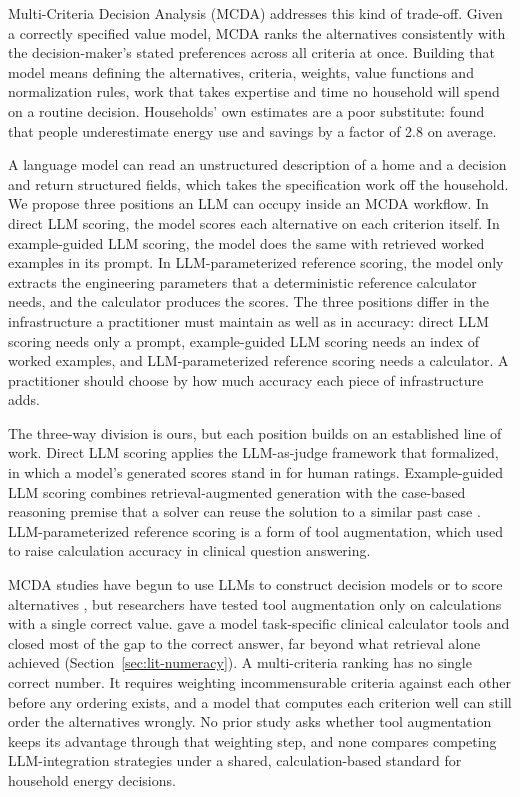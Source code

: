 \documentclass[final,3p,times]{elsarticle}
\begin{document}
Multi-Criteria Decision Analysis (MCDA) \cite{huang2011} addresses this kind of trade-off. Given a correctly specified value model, MCDA ranks the alternatives consistently with the decision-maker's stated preferences across all criteria at once. Building that model means defining the alternatives, criteria, weights, value functions and normalization rules, work that takes expertise and time no household will spend on a routine decision. Households' own estimates are a poor substitute: \citet{attari2010} found that people underestimate energy use and savings by a factor of 2.8 on average.

A language model can read an unstructured description of a home and a decision and return structured fields, which takes the specification work off the household. We propose three positions an LLM can occupy inside an MCDA workflow. In direct LLM scoring, the model scores each alternative on each criterion itself. In example-guided LLM scoring, the model does the same with retrieved worked examples in its prompt. In LLM-parameterized reference scoring, the model only extracts the engineering parameters that a deterministic reference calculator needs, and the calculator produces the scores. The three positions differ in the infrastructure a practitioner must maintain as well as in accuracy: direct LLM scoring needs only a prompt, example-guided LLM scoring needs an index of worked examples, and LLM-parameterized reference scoring needs a calculator. A practitioner should choose by how much accuracy each piece of infrastructure adds.

The three-way division is ours, but each position builds on an established line of work. Direct LLM scoring applies the LLM-as-judge framework that \citet{zheng2023judging} formalized, in which a model's generated scores stand in for human ratings. Example-guided LLM scoring combines retrieval-augmented generation \cite{lewis2020} with the case-based reasoning premise that a solver can reuse the solution to a similar past case \cite{aamodtplaza1994,minorkaucher2024}. LLM-parameterized reference scoring is a form of tool augmentation, which \citet{goodell2025} used to raise calculation accuracy in clinical question answering.

MCDA studies have begun to use LLMs to construct decision models or to score alternatives \cite{svoboda2024,icaart26}, but researchers have tested tool augmentation only on calculations with a single correct value. \citet{goodell2025} gave a model task-specific clinical calculator tools and closed most of the gap to the correct answer, far beyond what retrieval alone achieved (Section~\ref{sec:lit-numeracy}). A multi-criteria ranking has no single correct number. It requires weighting incommensurable criteria against each other before any ordering exists, and a model that computes each criterion well can still order the alternatives wrongly. No prior study asks whether tool augmentation keeps its advantage through that weighting step, and none compares competing LLM-integration strategies under a shared, calculation-based standard for household energy decisions.
\end{document}
